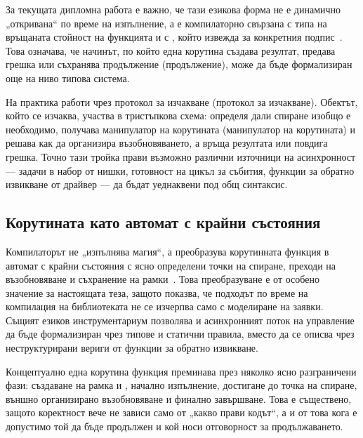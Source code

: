 За текущата дипломна работа е важно, че тази езикова форма не е динамично „откривана“ по време на изпълнение, а е компилаторно свързана с типа на връщаната стойност на функцията и с , който  извежда за конкретния подпис~\cite{cpp20standard,p0912r5}. Това означава, че начинът, по който една корутина създава резултат, предава грешка или съхранява продължение (продължение), може да бъде формализиран още на ниво типова система.

На практика  работи чрез протокол за изчакване (протокол за изчакване). Обектът, който се изчаква, участва в тристъпкова схема:  определя дали спиране изобщо е необходимо,  получава манипулатор на корутината (манипулатор на корутината) и решава как да организира възобновяването, а  връща резултата или повдига грешка. Точно тази тройка прави възможно различни източници на асинхронност --- задачи в набор от нишки, готовност на цикъл за събития, функции за обратно извикване от драйвер --- да бъдат уеднаквени под общ  синтаксис.

\subsection{Корутината като автомат с крайни състояния}

Компилаторът не „изпълнява магия“, а преобразува корутинната функция в автомат с крайни състояния с ясно определени точки на спиране, преходи на възобновяване и съхранение на рамки~\cite{p0912r5,p1063r0}. Това преобразуване е от особено значение за настоящата теза, защото показва, че подходът по време на компилация на библиотеката не се изчерпва само с моделиране на заявки. Същият езиков инструментариум позволява и асинхронният поток на управление да бъде формализиран чрез типове и статични правила, вместо да се описва чрез неструктурирани вериги от функции за обратно извикване.

Концептуално една корутина функция преминава през няколко ясно разграничени фази: създаване на рамка и , начално изпълнение, достигане до точка на спиране, външно организирано възобновяване и финално завършване. Това е съществено, защото коректност вече не зависи само от „какво прави кодът“, а и от това кога е допустимо той да бъде продължен и кой носи отговорност за продължаването.

